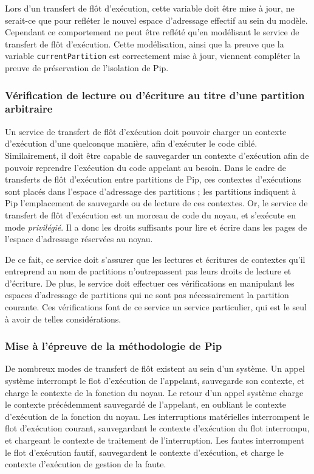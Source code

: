 		Lors d'un transfert de flôt d'exécution, cette variable doit être mise à jour, ne serait-ce que pour refléter le nouvel espace d'adressage effectif au sein du modèle. Cependant ce comportement ne peut être reflété qu'en modélisant le service de transfert de flôt d'exécution. Cette modélisation, ainsi que la preuve que la variable \texttt{currentPartition} est correctement mise à jour, viennent compléter la preuve de préservation de l'isolation de Pip.

		\subsubsection{Vérification de lecture ou d'écriture au titre d'une partition arbitraire}

		Un service de transfert de flôt d'exécution doit pouvoir charger un contexte d'exécution d'une quelconque manière, afin d'exécuter le code ciblé. Similairement, il doit être capable de sauvegarder un contexte d'exécution afin de pouvoir reprendre l'exécution du code appelant au besoin. Dans le cadre de transferts de flôt d'exécution entre partitions de Pip, ces contextes d'exécutions sont placés dans l'espace d'adressage des partitions ; les partitions indiquent à Pip l'emplacement de sauvegarde ou de lecture de ces contextes. Or, le service de transfert de flôt d'exécution est un morceau de code du noyau, et s'exécute en mode \emph{privilégié}. Il a donc les droits suffisants pour lire et écrire dans les pages de l'espace d'adressage réservées au noyau.

		De ce fait, ce service doit s'assurer que les lectures et écritures de contextes qu'il entreprend au nom de partitions n'outrepassent pas leurs droits de lecture et d'écriture. De plus, le service doit effectuer ces vérifications en manipulant les espaces d'adressage de partitions qui ne sont pas nécessairement la partition courante. Ces vérifications font de ce service un service particulier, qui est le seul à avoir de telles considérations.

		\subsubsection{Mise à l'épreuve de la méthodologie de Pip}
		
		De nombreux modes de transfert de flôt existent au sein d'un système. Un appel système interrompt le flot d'exécution de l'appelant, sauvegarde son contexte, et charge le contexte de la fonction du noyau. Le retour d'un appel système charge le contexte précédemment sauvegardé de l'appelant, en oubliant le contexte d'exécution de la fonction du noyau. Les interruptions matérielles interrompent le flot d'exécution courant, sauvegardant le contexte d'exécution du flot interrompu, et chargeant le contexte de traitement de l'interruption. Les fautes interrompent le flot d'exécution fautif, sauvegardent le contexte d'exécution, et charge le contexte d'exécution de gestion de la faute.

